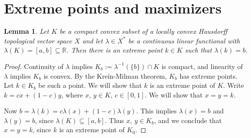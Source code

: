\documentclass[12pt]{amsart} \usepackage{amsmath,centernot,amssymb,leftindex}
\newtheorem{lemma}[theorem]{Lemma}
\numberwithin{theorem}{section}
\numberwithin{equation}{section}
\theoremstyle{definition}
\begin{document}
	















\section{Extreme points and maximizers}

\begin{lemma}\label{lem:UBDrealized}
	Let $K$ be a compact convex subset of a locally convex Hausdorff topological vector space $X$ and let $\lambda \in X^{*}$ be a continuous linear functional with $\lambda(K)=[a,b]\subseteq \mathbb R$.  Then there is an extreme point $k\in K$ such that $\lambda(k)=b$.
\end{lemma}

\begin{proof}
Continuity of $\lambda$  implies $K_{b}:=\lambda^{-1}(\{b\})\cap K$ is compact, and  linearity of $\lambda$ implies $K_{b}$ is convex.  By the Krein-Milman theorem, $K_{b}$ has extreme points.  Let $k\in K_{b}$ be such a point.  We will show that $k$ is an extreme point of $K$.  Write $k = cx+(1-c)y$, where $x$,  $y\in K$, $c\in [0,1]$.  We will show that $x=y=k$.  

Now $b=\lambda(k)=c\lambda(x)+(1-c)\lambda(y)$.  This implies $\lambda(x)=b$ and $\lambda(y)=b$, since $\lambda(K)\subseteq [a,b]$.  Thus $x$, $y\in K_{b}$, and we conclude that $x=y=k$, since $k$ is an extreme point of $K_{0}$.
\end{proof}








	\printbibliography

%
% 
\end{document}
